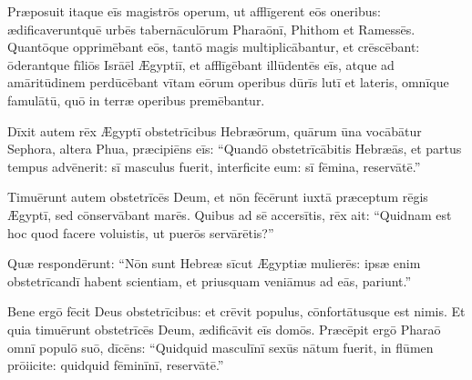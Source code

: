 Præposuit itaque eīs magistrōs operum, ut afflīgerent eōs oneribus: 
ædificaveruntquē urbēs tabernāculōrum Pharaōnī, Phithom et Ramessēs.
Quantōque opprimēbant eōs, tantō magis multiplicābantur, et crēscēbant: 
ōderantque fīliōs Isrāēl Ægyptiī, et afflīgēbant illūdentēs eīs,
atque ad amāritūdinem perdūcēbant vītam eōrum operibus dūrīs lutī et lateris, omnīque famulātū, quō in terræ operibus premēbantur. 

Dīxit autem rēx Ægyptī  obstetrīcibus Hebræōrum, quārum ūna vocābātur Sephora, altera Phua, 
 præcipiēns eīs: ``Quandō obstetrīcābitis Hebræās, et  partus tempus advēnerit: sī masculus fuerit, interficite eum: sī fēmina, reservātē.''

Timuērunt autem obstetrīcēs Deum, et nōn fēcērunt iuxtā præceptum rēgis Ægyptī, sed cōnservābant marēs. 
Quibus ad sē accersītis, rēx ait: ``Quidnam est hoc quod facere voluistis, ut puerōs servārētis?''

Quæ respondērunt: ``Nōn sunt Hebreæ sīcut Ægyptiæ mulierēs: ipsæ enim obstetrīcandī habent scientiam, et priusquam veniāmus ad eās, pariunt.''

Bene ergō fēcit Deus obstetrīcibus: et crēvit populus, cōnfortātusque est nimis.
Et quia timuērunt obstetrīcēs Deum, ædificāvit eīs domōs.
Præcēpit ergō Pharaō omnī populō suō, dīcēns: ``Quidquid masculīnī sexūs nātum fuerit, in flūmen prōiicite: quidquid fēminīnī, reservātē.''
